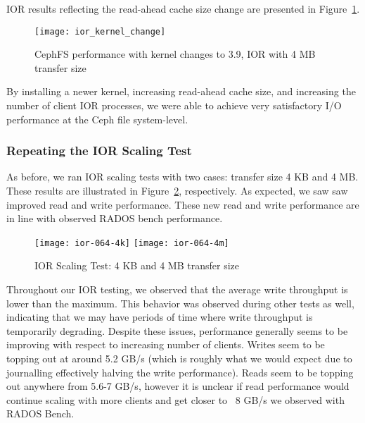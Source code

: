 


IOR results reflecting the read-ahead cache size change are presented in
Figure~\ref{fig:ior-kernel-39}.

\begin{figure}[htb]
\centering
\texttt{[image: ior\_kernel\_change]}
\caption{CephFS performance with kernel changes to 3.9, IOR with 4 MB transfer
size}
\label{fig:ior-kernel-39}
\end{figure}


By installing a newer kernel, increasing read-ahead cache size, and increasing
the number of client IOR processes, we were able to achieve very satisfactory
I/O performance at the Ceph file system-level.


\subsubsection{Repeating the IOR Scaling Test}

As before, we ran IOR scaling tests with two cases: transfer size 4 KB and 4
MB.  These results are illustrated in Figure~\ref{fig:ior-064}, respectively.
As expected, we saw saw  improved read and write performance. These new read
and write performance are in line with observed RADOS bench performance.


\begin{figure}[htb]
\centering
\texttt{[image: ior-064-4k]}
\texttt{[image: ior-064-4m]}
\caption{IOR Scaling Test: 4 KB and 4 MB transfer size}
\label{fig:ior-064}
\end{figure}

Throughout our IOR testing, we observed that the average write throughput is
lower than the maximum.  This behavior was observed during other tests as well,
indicating that we may have periods of time where write throughput is
temporarily degrading.  Despite these issues, performance generally seems to be
improving with respect to increasing number of clients.  Writes seem to be
topping out at around 5.2 GB/s (which is roughly what we would expect due to
journalling effectively halving the write performance).  Reads seem to be
topping out anywhere from 5.6-7 GB/s, however it is unclear if read performance
would continue scaling with more clients and get closer to ~8 GB/s we observed 
with RADOS Bench.

